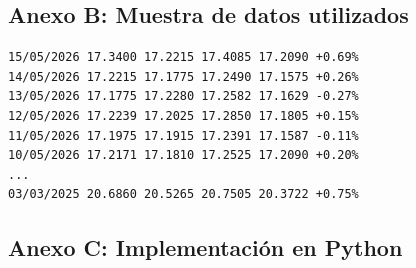 \subsection{Anexo B: Muestra de datos utilizados}

\begin{verbatim}
15/05/2026 17.3400 17.2215 17.4085 17.2090 +0.69%
14/05/2026 17.2215 17.1775 17.2490 17.1575 +0.26%
13/05/2026 17.1775 17.2280 17.2582 17.1629 -0.27%
12/05/2026 17.2239 17.2025 17.2850 17.1805 +0.15%
11/05/2026 17.1975 17.1915 17.2391 17.1587 -0.11%
10/05/2026 17.2171 17.1810 17.2525 17.2090 +0.20%
...
03/03/2025 20.6860 20.5265 20.7505 20.3722 +0.75%
\end{verbatim}

\subsection{Anexo C: Implementación en Python}

